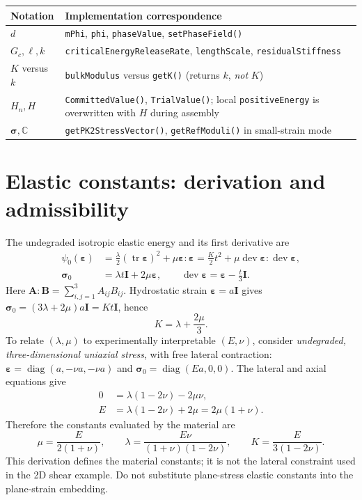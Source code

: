 \documentclass[11pt,a4paper]{article}
\newcommand{\eps}{\bm{\varepsilon}}
\newcommand{\sig}{\bm{\sigma}}
\newcommand{\I}{\bm{I}}
\newcommand{\C}{\mathbb{C}}
\newcommand{\tr}{\operatorname{tr}}
\newcommand{\dev}{\operatorname{dev}}
\newcommand{\code}[1]{\texttt{\small #1}}
\newcommand{\sectionpage}[1]{\clearpage\section{#1}}
\numberwithin{equation}{section}
\begin{document}
\begin{tabular}{@{}p{.21\linewidth}p{.72\linewidth}@{}}
\toprule Notation & Implementation correspondence\\\midrule
$d$ & \code{mPhi}, \code{phi}, \code{phaseValue}, \code{setPhaseField()}\\
$G_c,\ell,k$ & \code{criticalEnergyReleaseRate}, \code{lengthScale}, \code{residualStiffness}\\
$K$ versus $k$ & \code{bulkModulus} versus \code{getK()} (returns $k$, \emph{not} $K$)\\
$H_n,H$ & \code{CommittedValue()}, \code{TrialValue()}; local \code{positiveEnergy} is overwritten with $H$ during assembly\\
$\sig,\C$ & \code{getPK2StressVector()}, \code{getRefModuli()} in small-strain mode\\
\bottomrule
\end{tabular}

\sectionpage{Elastic constants: derivation and admissibility}
\label{sec:elastic}
The undegraded isotropic elastic energy and its first derivative are
\begin{align}
 \psi_0(\eps)&=\frac{\lambda}{2}(\tr\eps)^2+\mu\eps:\eps
 =\frac K2 t^2+\mu\dev\eps:\dev\eps,\label{eq:psi0}\\
 \sig_0&=\lambda t\I+2\mu\eps,
 \qquad\dev\eps=\eps-\frac t3\I.\label{eq:sigma0}
\end{align}
Here $\bm A:\bm B=\sum_{i,j=1}^3 A_{ij}B_{ij}$. Hydrostatic strain
$\eps=a\I$ gives $\sig_0=(3\lambda+2\mu)a\I=K t\I$, hence
\begin{equation}K=\lambda+\frac{2\mu}{3}.\end{equation}
To relate $(\lambda,\mu)$ to experimentally interpretable $(E,\nu)$, consider
\emph{undegraded, three-dimensional uniaxial stress}, with free lateral
contraction: $\eps=\operatorname{diag}(a,-\nu a,-\nu a)$ and
$\sig_0=\operatorname{diag}(Ea,0,0)$. The lateral and axial equations give
\begin{align}
 0&=\lambda(1-2\nu)-2\mu\nu,\\
 E&=\lambda(1-2\nu)+2\mu=2\mu(1+\nu).
\end{align}
Therefore the constants evaluated by the material are
\begin{equation}\boxed{
 \mu=\frac{E}{2(1+\nu)},\qquad
 \lambda=\frac{E\nu}{(1+\nu)(1-2\nu)},\qquad
 K=\frac{E}{3(1-2\nu)}.}\label{eq:constants}
\end{equation}
This derivation defines the material constants; it is not the lateral constraint
used in the 2D shear example. Do not substitute plane-stress elastic constants
into the plane-strain embedding.
\end{document}
